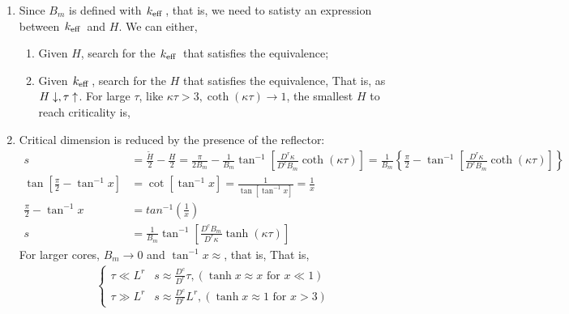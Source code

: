 \documentclass{school-22.211-notes}
\begin{document}
\begin{enumerate}
\item Since $B_m$ is defined with $\left. k_{\mathrm{eff}} \right.$, that is, we need to satisty an expression between $\left. k_{\mathrm{eff}} \right.$ and $H$. We can either,
  \begin{enumerate}
  \item Given $H$, search for the $\left. k_{\mathrm{eff}} \right.$ that satisfies the equivalence;
  \item Given $\left. k_{\mathrm{eff}} \right.$, search for the $H$ that satisfies the equivalence,
    That is, as $H \downarrow, \tau \uparrow$. For large $\tau$, like $\kappa \tau > 3, \coth (\kappa \tau) \to 1$, the smallest $H$ to reach criticality is,
  \end{enumerate}
\item Critical dimension is reduced by the presence of the reflector: 
\begin{align}
  s &= \frac{\tilde{H}}{2} - \frac{H}{2}  = \frac{\pi}{2B_m} - \frac{1}{B_m} \tan^{-1} \left[ \frac{D^r \kappa}{D^c B_m} \coth (\kappa \tau) \right] 
  = \frac{1}{B_m} \left\{ \frac{\pi}{2} - \tan^{-1} \left[ \frac{D^r \kappa}{D^c B_m} \coth(\kappa \tau) \right] \right\} \\
  \tan\left[ \frac{\pi}{2} - \tan^{-1} x \right] &= \cot [\tan^{-1} x ] = \frac{1}{\tan[\tan^{-1} x]} = \frac{1}{x} \\
  \frac{\pi}{2} - \tan^{-1} x &= tan^{-1} \left( \frac{1}{x} \right) \\
  s &= \frac{1}{B_m} \tan^{-1} \left[ \frac{D^c B_m}{D^r \kappa} \tanh(\kappa \tau) \right] 
\end{align}
For larger cores, $B_m \to 0$ and $\tan^{-1} x \approx $, that is, 
That is, 
\begin{align}
  \left\{ \begin{array}{cc} 
    \tau \ll L^r & s \approx \frac{D^c}{D^r} \tau, (\tanh x \approx x \mbox{ for }x\ll 1) \\
    \tau \gg L^r & s \approx \frac{D^c}{D^r} L^r, (\tanh x \approx 1 \mbox{ for }x > 3) 
  \end{array} \right. 
\end{align}
\end{enumerate}
\end{document}
